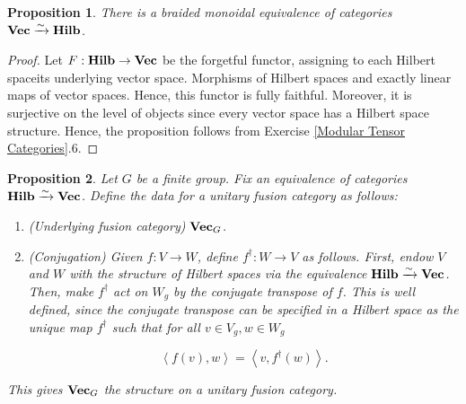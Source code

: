 \documentclass{article}
\newtheorem{proposition}{Proposition}[section]
\theoremstyle{definition}
\numberwithin{figure}{section}
\begin{document}
\begin{proposition} There is a braided monoidal equivalence of categories $\bold{Vec}\xrightarrow{\sim}\bold{Hilb}$.
\end{proposition}
\begin{proof} Let $F:\bold{Hilb}\to \bold{Vec}$ be the forgetful functor, assigning to each Hilbert spaceits underlying vector space. Morphisms of Hilbert spaces and exactly linear maps of vector spaces. Hence, this functor is fully faithful. Moreover, it is surjective on the level of objects since every vector space has a Hilbert space structure. Hence, the proposition follows from Exercise \ref{Modular Tensor Categories}.6.
\end{proof}

\begin{proposition} Let $G$ be a finite group. Fix an equivalence of categories $\bold{Hilb}\xrightarrow{\sim}\bold{Vec}$. Define the data for a unitary fusion category as follows:

\begin{enumerate}
\item (Underlying fusion category) $\bold{Vec}_{G}$.
\item (Conjugation) Given $f:V\to W$, define $f^{\dagger}:W\to V$ as follows. First, endow $V$ and $W$ with the structure of Hilbert spaces via the equivalence $\bold{Hilb}\xrightarrow{\sim}\bold{Vec}$. Then, make $f^{\dagger}$ act on $W_g$ by the conjugate transpose of $f$. This is well defined, since the conjugate transpose can be specified in a Hilbert space as the unique map $f^{\dagger}$ such that for all $v\in V_g, w\in W_g$

$$\left<f(v),w\right>=\left<v,f^{\dagger}(w)\right>.$$

\end{enumerate}

This gives $\bold{Vec}_G$ the structure on a unitary fusion category.
\end{proposition}
\end{document}
